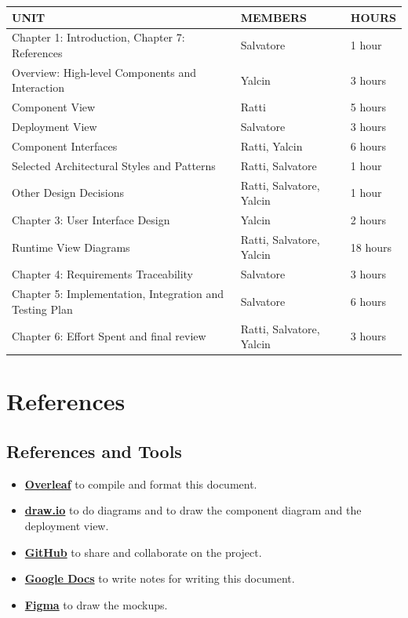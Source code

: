 \documentclass[a4paper,12pt]{article}
\begin{document}
\begin{center}
    \begin{tabular}{|m{5cm}|m{5cm}|m{2cm}|}
        \hline
        \textbf{UNIT} & \textbf{MEMBERS} & \textbf{HOURS} \\ \hline
        Chapter 1: Introduction, Chapter 7: References & Salvatore & 1 hour\\ \hline
        Overview: High-level Components and Interaction & Yalcin & 3 hours\\ \hline
        Component View & Ratti & 5 hours\\ \hline
        Deployment View & Salvatore & 3 hours\\ \hline
        Component Interfaces & Ratti, Yalcin & 6 hours\\ \hline
        Selected Architectural Styles and Patterns & Ratti, Salvatore & 1 hour\\ \hline
        Other Design Decisions & Ratti, Salvatore, Yalcin & 1 hour\\ \hline
        Chapter 3: User Interface Design & Yalcin & 2 hours\\ \hline
        Runtime View Diagrams & Ratti, Salvatore, Yalcin & 18 hours \\ \hline
        Chapter 4: Requirements Traceability & Salvatore & 3 hours \\ \hline
        Chapter 5: Implementation, Integration and Testing Plan  & Salvatore & 6 hours\\ \hline
        Chapter 6: Effort Spent and final review & Ratti, Salvatore, Yalcin & 3 hours\\ \hline
    \end{tabular}
\end{center}
\newpage

\section{References}
\subsection{References and Tools}
\begin{itemize}
    \item \textbf{\href{https://www.overleaf.com/}{Overleaf}} to compile and format this document.
    \item \textbf{\href{https://www.draw.io}{draw.io}} to do diagrams and to draw the component diagram and the deployment view.
    \item \textbf{\href{https://github.com}{GitHub}} to share and collaborate on the project.
    \item \textbf{\href{https://docs.google.com}{Google Docs}} to write notes for writing this document.
    \item \textbf{\href{https://www.figma.com}{Figma}} to draw the mockups.
\end{itemize}
\end{document}
